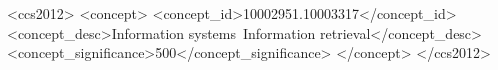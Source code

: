 \begin{CCSXML}
<ccs2012>
   <concept>
       <concept_id>10002951.10003317</concept_id>
       <concept_desc>Information systems~Information retrieval</concept_desc>
       <concept_significance>500</concept_significance>
   </concept>
</ccs2012>
\end{CCSXML}



\maketitle


